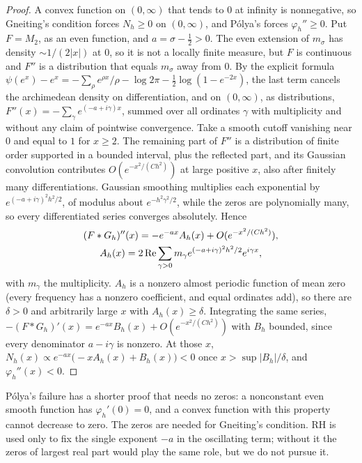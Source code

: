 \begin{proof}
A convex function on $(0,\infty)$ that tends to $0$ at infinity is nonnegative, so Gneiting's condition forces $N_h\ge0$ on $(0,\infty)$, and Pólya's forces $\varphi_h''\ge0$. Put $F=M_2$, as an even function, and $a=\sigma-\frac12>0$. The even extension of $m_\sigma$ has density $\sim1/(2|x|)$ at $0$, so it is not a locally finite measure, but $F$ is continuous and $F''$ is a distribution that equals $m_\sigma$ away from $0$. By the explicit formula $\psi(e^x)-e^x=-\sum_\rho e^{\rho x}/\rho-\log2\pi-\frac12\log(1-e^{-2x})$, the last term cancels the archimedean density on differentiation, and on $(0,\infty)$, as distributions, $F''(x)=-\sum_\gamma e^{(-a+i\gamma)x}$, summed over all ordinates $\gamma$ with multiplicity and without any claim of pointwise convergence. Take a smooth cutoff vanishing near $0$ and equal to $1$ for $x\ge2$. The remaining part of $F''$ is a distribution of finite order supported in a bounded interval, plus the reflected part, and its Gaussian convolution contributes $O(e^{-x^2/(Ch^2)})$ at large positive $x$, also after finitely many differentiations. Gaussian smoothing multiplies each exponential by $e^{(-a+i\gamma)^2h^2/2}$, of modulus about $e^{-h^2\gamma^2/2}$, while the zeros are polynomially many, so every differentiated series converges absolutely. Hence
\begin{multline*}
(F*G_h)''(x)=-e^{-ax}A_h(x)+O(e^{-x^2/(Ch^2)}),\\ A_h(x)=2\operatorname{Re}\sum_{\gamma>0}m_\gamma e^{(-a+i\gamma)^2h^2/2}e^{i\gamma x},
\end{multline*}
with $m_\gamma$ the multiplicity. $A_h$ is a nonzero almost periodic function of mean zero (every frequency has a nonzero coefficient, and equal ordinates add), so there are $\delta>0$ and arbitrarily large $x$ with $A_h(x)\ge\delta$. Integrating the same series, $-(F*G_h)'(x)=e^{-ax}B_h(x)+O(e^{-x^2/(Ch^2)})$ with $B_h$ bounded, since every denominator $a-i\gamma$ is nonzero. At those $x$, $N_h(x)\propto e^{-ax}\big(-xA_h(x)+B_h(x)\big)<0$ once $x>\sup|B_h|/\delta$, and $\varphi_h''(x)<0$.
\end{proof}

Pólya's failure has a shorter proof that needs no zeros: a nonconstant even smooth function has $\varphi_h'(0)=0$, and a convex function with this property cannot decrease to zero. The zeros are needed for Gneiting's condition. RH is used only to fix the single exponent $-a$ in the oscillating term; without it the zeros of largest real part would play the same role, but we do not pursue it.

